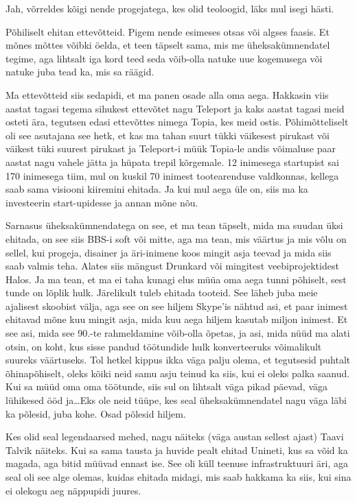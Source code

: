 
Jah, võrreldes kõigi nende progejatega, kes olid teoloogid, läks mul isegi 
hästi.


Põhiliselt ehitan ettevõtteid. Pigem nende esimeses otsas või algses faasis. Et 
mõnes mõttes võibki öelda, et teen täpselt sama, mis me üheksakümnendatel 
tegime, aga lihtsalt iga kord teed seda võib-olla natuke uue kogemusega või 
natuke juba tead ka, mis sa räägid. 

Ma ettevõtteid siis sedapidi, et ma panen osade alla oma aega. Hakkasin viis 
aastat tagasi tegema sihukest ettevõtet nagu Teleport ja kaks aastat tagasi 
meid osteti ära, tegutsen edasi ettevõttes nimega Topia, kes  meid ostis. 
Põhimõtteliselt oli see asutajana see hetk, et kas ma tahan suurt tükki 
väikesest pirukast või väikest tüki suurest pirukast ja Teleport-i müük 
Topia-le andis võimaluse paar aastat nagu vahele jätta ja hüpata trepil 
kõrgemale. 12 inimesega startupist sai 170 inimesega tiim, mul on kuskil 70 
inimest tootearenduse valdkonnas, kellega saab sama visiooni kiiremini ehitada. 
Ja kui mul aega üle on, siis ma ka investeerin start-upidesse ja annan mõne 
nõu. 

Sarnasus üheksakümnendatega on see, et ma tean täpselt, mida ma suudan üksi 
ehitada, on see siis BBS-i soft või mitte, aga ma tean, mis väärtus ja mis võlu 
on sellel, kui progeja, disainer ja äri-inimene koos mingit asja teevad ja mida 
siis saab valmis teha. Alates siis mängust Drunkard või  mingitest 
veebiprojektidest Halos. Ja ma tean, et ma ei taha kunagi elus müüa oma aega 
tunni põhiselt, sest tunde on lõplik hulk. Järelikult tuleb ehitada tooteid. 
See läheb juba meie ajalisest skoobist välja, aga see on see hiljem 
Skype'is nähtud asi, et paar inimest ehitavad mõne kuu mingit asja, 
mida kuu aega hiljem kasutab miljon inimest. Et see asi, mida  see 90.-te  
rahmeldamine võib-olla õpetas, ja asi, mida nüüd ma alati otsin, on koht, kus 
sisse pandud töötundide hulk konverteeruks võimalikult suureks väärtuseks. Tol 
hetkel kippus ikka väga palju olema, et tegutsesid  puhtalt õhinapõhiselt, 
oleks kõiki neid samu asju teinud ka siis, kui ei oleks palka saanud. Kui sa 
müüd oma oma töötunde, siis sul on lihtsalt väga pikad päevad, väga lühikesed 
ööd ja\ldots Eks ole neid tüüpe, kes seal üheksakümnendatel nagu väga läbi ka 
põlesid, juba kohe. Osad põlesid hiljem. 

Kes olid seal legendaarsed mehed, nagu näiteks (väga austan sellest ajast)  
Taavi Talvik näiteks. Kui sa  sama tausta ja huvide 
pealt ehitad Unineti, kus sa võid ka magada, aga bitid müüvad 
ennast ise. See oli küll  teenuse infrastruktuuri äri, aga seal oli see alge 
olemas, kuidas ehitada midagi, mis saab hakkama ka siis, kui sina ei olekogu 
aeg näppupidi juures.